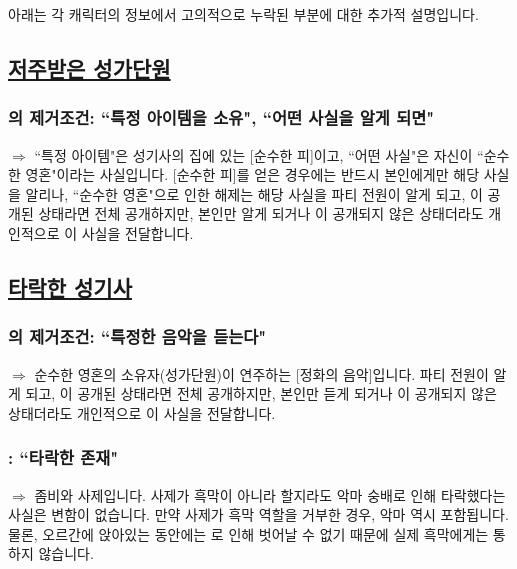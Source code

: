 \documentclass{report}
\begin{document}
	아래는 각 캐릭터의 정보에서 고의적으로 누락된 부분에 대한 추가적 설명입니다.
	
	\subsection*{\large \hyperlink{cursed-bard}{저주받은 성가단원}}
		\subsubsection*{\normalsize {}의 제거조건: ``특정 아이템을 소유", ``어떤 사실을 알게 되면"}
			$\Rightarrow$ ``특정 아이템"은 성기사의 집에 있는 [순수한 피]이고, ``어떤 사실"은 자신이 ``순수한 영혼"이라는 사실입니다. [순수한 피]를 얻은 경우에는 반드시 본인에게만 해당 사실을 알리나, ``순수한 영혼"으로 인한 해제는 해당 사실을 파티 전원이 알게 되고, 이 공개된 상태라면 전체 공개하지만, 본인만 알게 되거나 이 공개되지 않은 상태더라도 개인적으로 이 사실을 전달합니다.
	
	\subsection*{\large \hyperlink{corrupt-paladin}{타락한 성기사}}
		\subsubsection*{\normalsize {}의 제거조건: ``특정한 음악을 듣는다"}
			$\Rightarrow$ 순수한 영혼의 소유자(성가단원)이 연주하는 [정화의 음악]입니다. 파티 전원이 알게 되고, 이 공개된 상태라면 전체 공개하지만, 본인만 듣게 되거나 이 공개되지 않은 상태더라도 개인적으로 이 사실을 전달합니다.
			
		\subsubsection*{\normalsize {}: ``타락한 존재"}
			$\Rightarrow$ 좀비와 사제입니다. 사제가 흑막이 아니라 할지라도 악마 숭배로 인해 타락했다는 사실은 변함이 없습니다. 만약 사제가 흑막 역할을 거부한 경우, 악마 역시 포함됩니다. 물론, 오르간에 앉아있는 동안에는 로 인해 벗어날 수 없기 때문에 실제 흑막에게는 통하지 않습니다.
\end{document}
